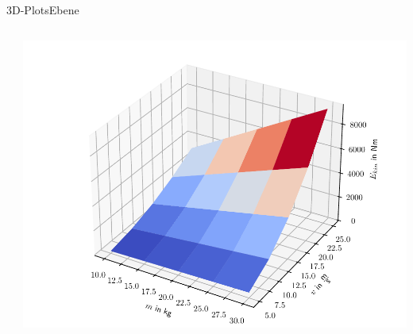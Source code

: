 \documentclass[xelatex,aspectratio=169]{beamer}
\begin{document}
\begin{frame}{3D-Plots}{Ebene}
    \begin{columns}
        \begin{column}{0.6\textwidth}
            \vspace{-\baselineskip}
            \small
            \inputminted[firstline=7]{python}{src/plt_3d_plane.py}
        \end{column}
        \begin{column}{0.4\textwidth}
            \includegraphics[width=\textwidth]{fig/plt_3d_plane.pdf}
        \end{column}
    \end{columns}
\end{frame}
\end{document}
